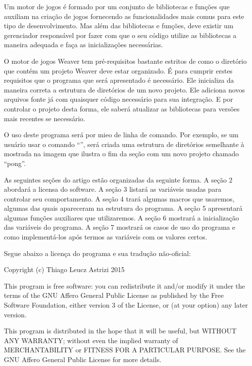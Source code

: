
Um motor de jogos é formado por um conjunto de bibliotecas e funções
que auxiliam na criação de jogos fornecendo as funcionalidades mais
comus para este tipo de desenvolvimento. Mas além das bibliotecas e
funções, deve existir um gerenciador responsável por fazer com que o
seu código utilize as bibliotecas a maneira adequada e faça as
inicializações necessárias.

O motor de jogos Weaver tem pré-requisitos bastante estritos de como o
diretório que contém um projeto Weaver deve estar organizado. É para
cumprir erstes requisitos que o programa que será apresentado é
necessário. Ele inicializa da maneira correta a estrutura de
diretórios de um novo projeto. Ele adiciona novos arquivos fonte já
com quaisquer código necessário para sua integração. E por controlar o
projeto desta forma, ele saberá atualizar as bibliotecas para versões
mais recentes se necessário.

O uso deste programa será por mieo de linha de comando. Por exemplo,
se um usuário usar o comando ``'', será criada
uma estrutura de diretórios semelhante à mostrada na imagem que
ilustra o fim da seção com um novo projeto chamado ``pong''.


As seguintes seções do artigo estão organizadas da seguinte forma. A
seção 2 abordará a licensa do software. A seção 3 listará as variáveis
usadas para controlar seu comportamento. A seção 4 trará algumas
macros que usaremos, algumas das quais apareceram na estrutura do
programa. A seção 5 apresentará algumas funções auxiliares que
utilizaremos. A seção 6 mostrará a inicialização das variáveis do
programa. A seção 7 mostrará os casos de uso do programa e como
implementá-los após termos as variáveis com os valores certos.


Segue abaixo a licença do programa e sua tradução não-oficial:

\espaco{5mm}\linha
\alinhaverbatim
Copyright (c) Thiago Leucz Astrizi 2015

This program is free software: you can redistribute it and/or
modify it under the terms of the GNU Affero General Public License as
published by the Free Software Foundation, either version 3 of
the License, or (at your option) any later version.

This program is distributed in the hope that it will be useful,
but WITHOUT ANY WARRANTY; without even the implied warranty of
MERCHANTABILITY or FITNESS FOR A PARTICULAR PURPOSE.  See the
GNU Affero General Public License for more details.

